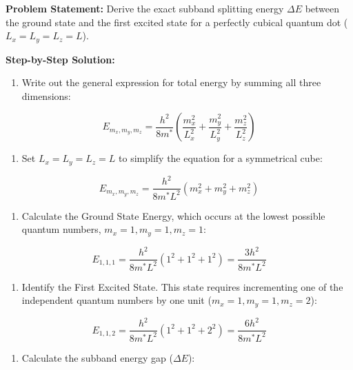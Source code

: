 \documentclass[
]{article}
\providecommand{\tightlist}{%
  \setlength{\itemsep}{0pt}\setlength{\parskip}{0pt}}
\begin{document}
\textbf{Problem Statement:} Derive the exact subband splitting energy
\(\Delta E\) between the ground state and the first excited state for a
perfectly cubical quantum dot (\(L_x = L_y = L_z = L\)).

\textbf{Step-by-Step Solution:}

\begin{enumerate}
\def\labelenumi{\arabic{enumi}.}
\tightlist
\item
  Write out the general expression for total energy by summing all three
  dimensions:
\end{enumerate}

\[E_{m_x, m_y, m_z} = \frac{h^2}{8m^*}\left( \frac{m_x^2}{L_x^2} + \frac{m_y^2}{L_y^2} + \frac{m_z^2}{L_z^2} \right)\]

\begin{enumerate}
\def\labelenumi{\arabic{enumi}.}
\setcounter{enumi}{1}
\tightlist
\item
  Set \(L_x = L_y = L_z = L\) to simplify the equation for a symmetrical
  cube:
\end{enumerate}

\[E_{m_x, m_y, m_z} = \frac{h^2}{8m^* L^2}\left( m_x^2 + m_y^2 + m_z^2 \right)\]

\begin{enumerate}
\def\labelenumi{\arabic{enumi}.}
\setcounter{enumi}{2}
\tightlist
\item
  Calculate the Ground State Energy, which occurs at the lowest possible
  quantum numbers, \(m_x=1, m_y=1, m_z=1\):
\end{enumerate}

\[E_{1,1,1} = \frac{h^2}{8m^* L^2}\left( 1^2 + 1^2 + 1^2 \right) = \frac{3h^2}{8m^* L^2}\]

\begin{enumerate}
\def\labelenumi{\arabic{enumi}.}
\setcounter{enumi}{3}
\tightlist
\item
  Identify the First Excited State. This state requires incrementing one
  of the independent quantum numbers by one unit
  (\(m_x=1, m_y=1, m_z=2\)):
\end{enumerate}

\[E_{1,1,2} = \frac{h^2}{8m^* L^2}\left( 1^2 + 1^2 + 2^2 \right) = \frac{6h^2}{8m^* L^2}\]

\begin{enumerate}
\def\labelenumi{\arabic{enumi}.}
\setcounter{enumi}{4}
\tightlist
\item
  Calculate the subband energy gap (\(\Delta E\)):
\end{enumerate}
\end{document}
